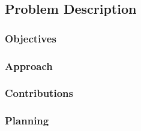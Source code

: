 
\subsection{Problem Description}

\subsubsection{Objectives}

\subsubsection{Approach}

\subsubsection{Contributions}

\subsubsection{Planning}